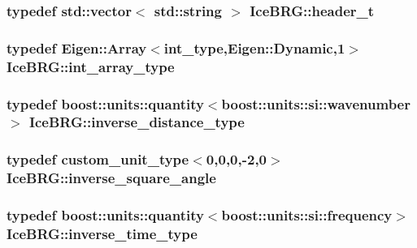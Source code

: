\hypertarget{namespaceIceBRG_a49e8b48f1dbd351e9748e7cbe80705df}{
\subsubsection[{header\-\_\-t}]{\setlength{\rightskip}{0pt plus 5cm}typedef std\-::vector$<$ std\-::string $>$ {\bf Ice\-B\-R\-G\-::header\-\_\-t}}}\label{namespaceIceBRG_a49e8b48f1dbd351e9748e7cbe80705df}
\hypertarget{namespaceIceBRG_a72d4ae57531ad9188ff53d6b8ff93d32}{
\subsubsection[{int\-\_\-array\-\_\-type}]{\setlength{\rightskip}{0pt plus 5cm}typedef Eigen\-::\-Array$<${\bf int\-\_\-type},Eigen\-::\-Dynamic,1$>$ {\bf Ice\-B\-R\-G\-::int\-\_\-array\-\_\-type}}}\label{namespaceIceBRG_a72d4ae57531ad9188ff53d6b8ff93d32}
\hypertarget{namespaceIceBRG_a2d5122b3cac0d29c24c8b92645057638}{
\subsubsection[{inverse\-\_\-distance\-\_\-type}]{\setlength{\rightskip}{0pt plus 5cm}typedef boost\-::units\-::quantity$<$boost\-::units\-::si\-::wavenumber$>$ {\bf Ice\-B\-R\-G\-::inverse\-\_\-distance\-\_\-type}}}\label{namespaceIceBRG_a2d5122b3cac0d29c24c8b92645057638}
\hypertarget{namespaceIceBRG_a26efaff9c9adf346c7d09d0b714731f6}{
\subsubsection[{inverse\-\_\-square\-\_\-angle}]{\setlength{\rightskip}{0pt plus 5cm}typedef custom\-\_\-unit\-\_\-type$<$0,0,0,-\/2,0$>$ {\bf Ice\-B\-R\-G\-::inverse\-\_\-square\-\_\-angle}}}\label{namespaceIceBRG_a26efaff9c9adf346c7d09d0b714731f6}
\hypertarget{namespaceIceBRG_a92c76f9b2ac706653b9b12c36904712c}{
\subsubsection[{inverse\-\_\-time\-\_\-type}]{\setlength{\rightskip}{0pt plus 5cm}typedef boost\-::units\-::quantity$<$boost\-::units\-::si\-::frequency$>$ {\bf Ice\-B\-R\-G\-::inverse\-\_\-time\-\_\-type}}}\label{namespaceIceBRG_a92c76f9b2ac706653b9b12c36904712c}
